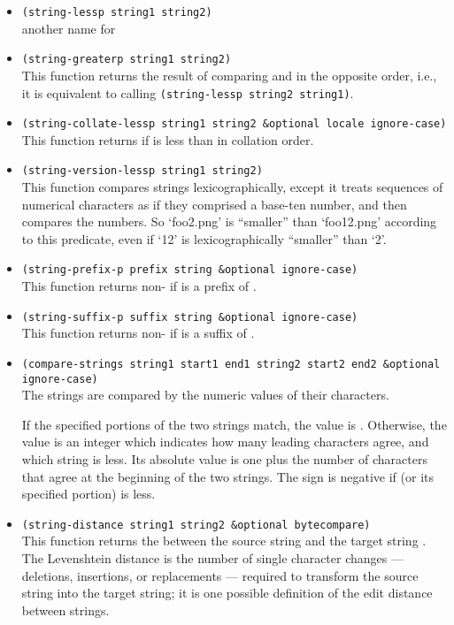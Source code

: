 \begin{itemize}[itemsep=10pt]
\item \lstinline|(string-lessp string1 string2)|\\
  another name for 
\item \lstinline|(string-greaterp string1 string2)|\\
  This function returns the result of comparing  and  in the opposite order, i.e., it is equivalent to calling \lstinline|(string-lessp string2 string1)|.
\item \lstinline|(string-collate-lessp string1 string2 &optional locale ignore-case)|\\
  This function returns  if  is less than  in collation order.
  
\item \lstinline|(string-version-lessp string1 string2)|\\
  This function compares strings lexicographically, except it treats sequences of numerical characters as if they comprised a base-ten number, and then compares the numbers.
  So ‘foo2.png’ is “smaller” than ‘foo12.png’ according to this predicate, even if ‘12’ is lexicographically “smaller” than ‘2’.
\item \lstinline|(string-prefix-p prefix string &optional ignore-case)|\\
  This function returns non- if  is a prefix of .
\item \lstinline|(string-suffix-p suffix string &optional ignore-case)|\\
  This function returns non- if  is a suffix of .
  
\item \lstinline|(compare-strings string1 start1 end1 string2 start2 end2 &optional ignore-case)|\\
  The strings are compared by the numeric values of their characters.

  If the specified portions of the two strings match, the value is .
  Otherwise, the value is an integer which indicates how many leading characters agree, and which string is less.
  Its absolute value is one plus the number of characters that agree at the beginning of the two strings.
  The sign is negative if  (or its specified portion) is less.
  
\item \lstinline|(string-distance string1 string2 &optional bytecompare)|\\
  This function returns the  between the source string  and the target string .
  The Levenshtein distance is the number of single character changes — deletions, insertions, or replacements — required to transform the source string into the target string; it is one possible definition of the edit distance between strings.

  
\end{itemize}

